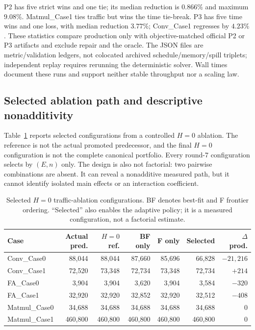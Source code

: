 P2 has five strict wins and one tie; its median reduction is $0.866\%$ and maximum $9.08\%$. Matmul\_Case1 ties traffic but wins the time tie-break. P3 has five time wins and one loss, with median reduction $3.77\%$; Conv\_Case1 regresses by $4.23\%$. These statistics compare production only with objective-matched official P2 or P3 artifacts and exclude repair and the oracle. The JSON files are metric/validation ledgers, not colocated archived schedule/memory/spill triplets; independent replay requires rerunning the deterministic solver. Wall times document these runs and support neither stable throughput nor a scaling law.

\subsection{Selected ablation path and descriptive nonadditivity}
\label{sec:supp-components}

Table~\ref{tab:supp-components} reports selected configurations from a
controlled $H=0$ ablation.  The reference is not the actual promoted
predecessor, and the final $H=0$ configuration is not the complete canonical
portfolio.  Every round-7 configuration selects by $(E,n)$ only.  The design is
also not factorial: two pairwise combinations are absent.  It can reveal a
nonadditive measured path, but it cannot identify isolated main effects or an
interaction coefficient.

\begin{table}[htbp]
\centering
\caption{Selected $H=0$ traffic-ablation configurations.  BF denotes best-fit
and F frontier ordering.  ``Selected'' also enables the adaptive policy; it is
a measured configuration, not a factorial estimate.}
\label{tab:supp-components}
\begin{tabular}{lrrrrrr}
\toprule
Case & Actual pred. & $H=0$ ref. & BF only & F only & Selected & $\Delta$ prod.\\
\midrule
Conv\_Case0 & 88,044 & 88,044 & 87,660 & 85,696 & 66,828 & $-21,216$\\
Conv\_Case1 & 72,520 & 73,348 & 72,734 & 73,348 & 72,734 & $+214$\\
FA\_Case0 & 3,904 & 3,904 & 3,620 & 3,904 & 3,584 & $-320$\\
FA\_Case1 & 32,920 & 32,920 & 32,852 & 32,920 & 32,512 & $-408$\\
Matmul\_Case0 & 34,688 & 34,688 & 34,688 & 34,688 & 34,688 & 0\\
Matmul\_Case1 & 460,800 & 460,800 & 460,800 & 460,800 & 460,800 & 0\\
\bottomrule
\end{tabular}
\end{table}

